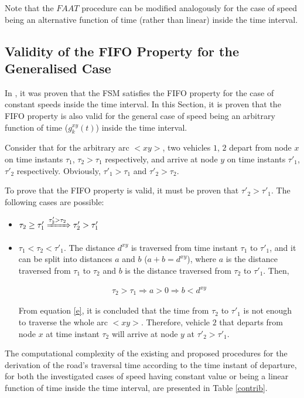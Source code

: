 \documentclass[conference]{IEEEtran}
\begin{document}
Note that the $FAAT$ procedure can be modified analogously for the case of speed being an alternative function of time (rather than linear) inside the time interval.  

\subsection{Validity of the FIFO Property for the Generalised Case}

In \cite{Sung}, it was proven that the FSM satisfies the FIFO property for the case of constant speeds inside the time interval. In this Section, it is proven that the FIFO property is also valid for the general case of speed being an arbitrary function of time ($g_k^{xy}(t)$) inside the time interval.

Consider that for the arbitrary arc $<xy>$, two vehicles $1$, $2$ depart from node $x$ on time instants $\tau_1$, $\tau_2>\tau_1$ respectively, and arrive at node $y$ on time instants $\tau'_1$, $\tau'_2$ respectively. Obviously,  $\tau'_1 >\tau_1$ and $\tau'_2 >\tau_2$. 




To prove that the FIFO property is valid, it must be proven that $\tau'_2 >\tau'_1$. The following cases are possible:
\begin{itemize}
    \item $\tau_2\geq \tau'_1\xRightarrow{\tau'_2 >\tau_2} \tau'_2 >\tau'_1$
    \item $\tau_1< \tau_2< \tau'_1$. The distance $d^{xy}$ is traversed from time instant $\tau_1$ to $\tau'_1$, and it can be split into distances $a$ and $b$ ($a+b=d^{xy}$), where $a$ is the distance traversed from $\tau_1$ to $\tau_2$ and $b$ is the distance traversed from $\tau_2$ to $\tau'_1$. Then,
    
        \begin{eqnarray}
        & \tau_2 >\tau_1 \Rightarrow a>0 \Rightarrow b< d^{xy}& \label{e}
        \end{eqnarray}

From equation \ref{e}, it is concluded that the time from $\tau_2$ to $\tau'_1$ is not enough to traverse the whole arc $<xy>$. Therefore, vehicle $2$ that departs from node $x$ at time instant $\tau_2$ will arrive at node  $y$ at $\tau'_2>\tau'_1$.   
\end{itemize}

The computational complexity of the existing and proposed procedures for the derivation of the road's traversal time according to the time instant of departure, for both the investigated cases of speed having constant value or being a linear function of time inside the time interval, are presented in Table \ref{contrib}.
\end{document}
